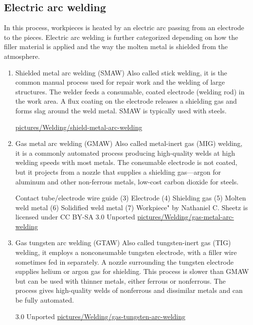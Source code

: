 \documentclass[a4paper,openany,12pt]{book}
\begin{document}
{{\subsection{Electric arc welding}
\label{electric-arc-welding}
In this process, workpieces is heated by an electric arc passing from an
electrode to the pieces. Electric arc welding is further categorized
depending on how the filler material is applied and the way the molten
metal is shielded from the atmosphere.

\begin{enumerate}
\item Shielded metal arc welding (SMAW)
\label{shielded-metal-arc-welding-smaw}
Also called stick welding, it is the common manual process used for
repair work and the welding of large structures. The welder feeds a
consumable, coated electrode (welding rod) in the work area. A flux
coating on the electrode releases a shielding gas and forms slag around
the weld metal. SMAW is typically used with steels.


\url{pictures/Welding/shield-metal-arc-welding}

\item Gas metal arc welding (GMAW)
\label{gas-metal-arc-welding-gmaw}
Also called metal-inert gas (MIG) welding, it is a commonly automated
process producing high-quality welds at high welding speeds with most
metals. The consumable electrode is not coated, but it projects from a
nozzle that supplies a shielding gas---argon for aluminum and other
non-ferrous metals, low-cost carbon dioxide for steels.


Contact tube/electrode wire guide (3) Electrode (4) Shielding gas (5)
Molten weld metal (6) Solidified weld metal (7) Workpiece" by Nathaniel
C. Sheetz is licensed under CC BY-SA 3.0 Unported
\url{pictures/Welding/gas-metal-arc-welding}

\item Gas tungsten arc welding (GTAW)
\label{gas-tungsten-arc-welding-gtaw}
Also called tungsten-inert gas (TIG) welding, it employs a nonconsumable
tungsten electrode, with a filler wire sometimes fed in separately. A
nozzle surrounding the tungsten electrode supplies helium or argon gas
for shielding. This process is slower than GMAW but can be used with
thinner metals, either ferrous or nonferrous. The process gives
high-quality welds of nonferrous and dissimilar metals and can be fully
automated.


3.0 Unported
\url{pictures/Welding/gas-tungsten-arc-welding}


\end{enumerate}}}
\end{document}
